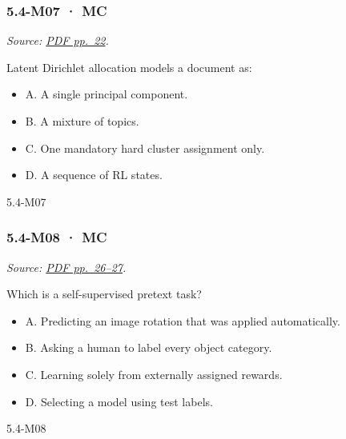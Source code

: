 \noindent\begin{minipage}{\linewidth}

\subsubsection{5.4-M07 · MC}\label{m07-mc-15}

\emph{Source:
\href{../Lecture\%20Slides/5.4.\%20Unsupervised\%20learning.pdf\#page=22}{PDF
pp.~22}.}

Latent Dirichlet allocation models a document as:

\begin{itemize}
\tightlist
\item
  A. A single principal component.
\item
  B. A mixture of topics.
\item
  C. One mandatory hard cluster assignment only.
\item
  D. A sequence of RL states.
\end{itemize}

\begin{solution}[8mm]{5.4-M07}

\end{solution}
\end{minipage}\par\medskip

\noindent\begin{minipage}{\linewidth}

\subsubsection{5.4-M08 · MC}\label{m08-mc-15}

\emph{Source:
\href{../Lecture\%20Slides/5.4.\%20Unsupervised\%20learning.pdf\#page=26}{PDF
pp.~26--27}.}

Which is a self-supervised pretext task?

\begin{itemize}
\tightlist
\item
  A. Predicting an image rotation that was applied automatically.
\item
  B. Asking a human to label every object category.
\item
  C. Learning solely from externally assigned rewards.
\item
  D. Selecting a model using test labels.
\end{itemize}

\begin{solution}[8mm]{5.4-M08}

\end{solution}
\end{minipage}\par\medskip

